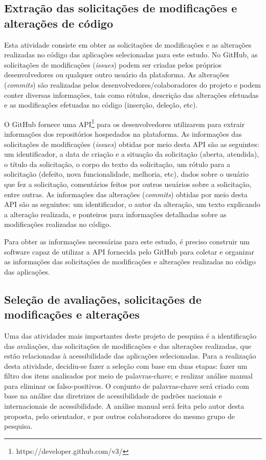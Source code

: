\subsection{Extração das solicitações de modificações e alterações de código}
\label{sec:extracaomodificacoes}

Esta atividade consiste em obter as solicitações de modificações e as alterações realizadas no código das aplicações selecionadas para este estudo. 
No GitHub, as solicitações de modificações (\textit{issues}) podem ser criadas pelos próprios desenvolvedores ou qualquer outro usuário da plataforma.
As alterações (\textit{commits}) são realizadas pelos desenvolvedores/colaboradores do projeto e podem conter diversas informações, tais como rótulos, descrição das alterações efetuadas e as modificações efetuadas no código (inserção, deleção, etc). 

O GitHub fornece uma API\footnote{https://developer.github.com/v3/} para os desenvolvedores utilizarem para extrair informações dos repositórios hospedados na plataforma.
As informações das solicitações de modificações (\textit{issues}) obtidas por meio desta API são as seguintes: 
um identificador, a data de criação e a situação da solicitação (aberta, atendida), o título da solicitação, o corpo do texto da solicitação, um rótulo para a solicitação (defeito, nova funcionalidade, melhoria, etc), dados sobre o usuário que fez a solicitação, comentários feitos por outros usuários sobre a solicitação, entre outras.
As informações das alterações (\textit{commits}) obtidas por meio desta API são as seguintes:
um identificador, o autor da alteração, um texto explicando a alteração realizada, e ponteiros para informações detalhadas sobre as modificações realizadas no código. 


Para obter as informações necessárias para este estudo, é preciso construir um software capaz de utilizar a API fornecida pelo GitHub  para coletar e organizar as informações das solicitações de modificações e alterações realizadas no código das aplicações. 

\subsection{Seleção de avaliações, solicitações de modificações e alterações}
\label{sec:selecao}

Uma das atividades mais importantes deste projeto de pesquisa é a identificação das avaliações, das solicitações de modificações e das alterações realizadas, que estão relacionadas à acessibilidade das aplicações selecionadas.
Para a realização desta atividade, decidiu-se fazer a seleção com base em duas etapas: 
fazer um filtro dos itens analisados por meio de palavras-chave; e realizar análise manual para eliminar os falso-positivos. 
O conjunto de palavras-chave será criado com base na análise das diretrizes de acessibilidade de padrões nacionais e internacionais de acessibilidade.
A análise manual será feita pelo autor desta proposta, pelo orientador, e por outros colaboradores do mesmo grupo de pesquisa. 


